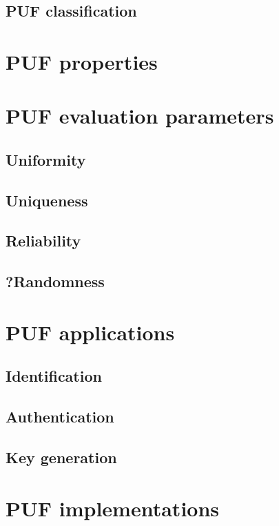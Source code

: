 \subsection{PUF classification}

\section{PUF properties}

\section{PUF evaluation parameters}

\subsection{Uniformity}
\subsection{Uniqueness}
\subsection{Reliability}
\subsection{?Randomness}

\section{PUF applications}

\subsection{Identification}
\subsection{Authentication}
\subsection{Key generation}

\section{PUF implementations}

